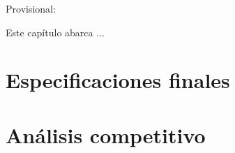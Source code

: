 Provisional:

Este capítulo abarca ...

\section{Especificaciones finales}

\section{Análisis competitivo}
